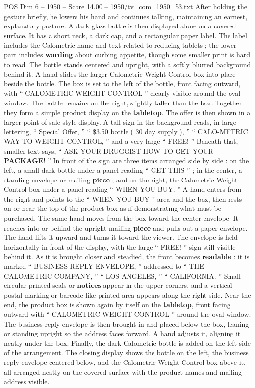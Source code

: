 \begin{textsample}{POS Dim 6 – 1950 – Score 14.00 – 1950/tv\_com\_1950\_53.txt}
After holding the gesture briefly, he lowers his hand and continues talking, maintaining an earnest, explanatory posture.
A dark glass bottle is then displayed alone on a covered surface.
It has a short neck, a dark cap, and a rectangular paper label.
The label includes the Calometric name and text related to reducing tablets ; the lower part includes \textbf{wording} about curbing appetite, though some smaller print is hard to read.
The bottle stands centered and upright, with a softly blurred background behind it.
A hand slides the larger Calometric Weight Control box into place beside the bottle.
The box is set to the left of the bottle, front facing outward, with “ CALOMETRIC WEIGHT CONTROL ” clearly visible around the oval window.
The bottle remains on the right, slightly taller than the box.
Together they form a simple product display on the \textbf{tabletop}.
The offer is then shown in a larger point-of-sale style display.
A tall sign in the background reads, in large lettering, “ Special Offer, ” “ \$3.50 bottle ( 30 day supply ), ” “ CALO-METRIC WAY TO WEIGHT CONTROL, ” and a very large “ FREE! ” Beneath that, smaller text says, “ ASK YOUR DRUGGIST HOW TO GET YOUR \textbf{PACKAGE}! ” In front of the sign are three items arranged side by side : on the left, a small dark bottle under a panel reading “ GET THIS ” ; in the center, a standing envelope or mailing \textbf{piece} ; and on the right, the Calometric Weight Control box under a panel reading “ WHEN YOU BUY. ” A hand enters from the right and points to the “ WHEN YOU BUY ” area and the box, then rests on or near the top of the product box as if demonstrating what must be purchased.
The same hand moves from the box toward the center envelope.
It reaches into or behind the upright mailing \textbf{piece} and pulls out a paper envelope.
The hand lifts it upward and turns it toward the viewer.
The envelope is held horizontally in front of the display, with the large “ FREE! ” sign still visible behind it.
As it is brought closer and steadied, the front becomes \textbf{readable} : it is marked “ BUSINESS REPLY ENVELOPE, ” addressed to “ THE CALOMETRIC COMPANY, ” “ LOS ANGELES, ” “ CALIFORNIA. ” Small circular printed seals or \textbf{notices} appear in the upper corners, and a vertical postal marking or barcode-like printed area appears along the right side.
Near the end, the product box is shown again by itself on the \textbf{tabletop}, front facing outward with “ CALOMETRIC WEIGHT CONTROL ” around the oval window.
The business reply envelope is then brought in and placed below the box, leaning or standing upright so the address faces forward.
A hand adjusts it, aligning it neatly under the box.
Finally, the dark Calometric bottle is added on the left side of the arrangement.
The closing display shows the bottle on the left, the business reply envelope centered below, and the Calometric Weight Control box above it, all arranged neatly on the covered surface with the product names and mailing address visible.

\end{textsample}
